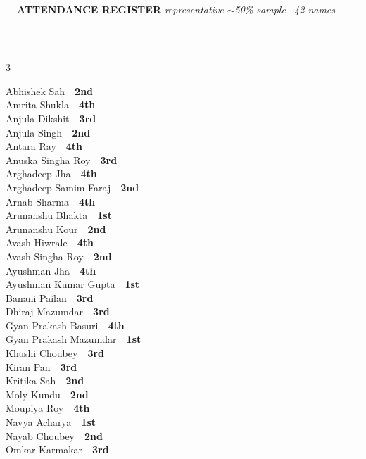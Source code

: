 \documentclass[11pt,a4paper]{article}
\begin{document}
\vspace{3pt}\noindent
{\footnotesize\bfseries\color{Slate}\faListOl~~ATTENDANCE REGISTER}%
\hfill{\scriptsize\itshape\color{Slate}representative $\sim$50\% sample \textperiodcentered\ 42 names}\\[3pt]
{\color{Line}\rule{\linewidth}{0.5pt}}\\[5pt]
\begingroup\footnotesize\setlength{\columnsep}{20pt}\setlength{\parskip}{1pt}%
\begin{multicols}{3}\raggedright
Abhishek Sah~\dotfill~\textbf{2nd}\\
Amrita Shukla~\dotfill~\textbf{4th}\\
Anjula Dikshit~\dotfill~\textbf{3rd}\\
Anjula Singh~\dotfill~\textbf{2nd}\\
Antara Ray~\dotfill~\textbf{4th}\\
Anuska Singha Roy~\dotfill~\textbf{3rd}\\
Arghadeep Jha~\dotfill~\textbf{4th}\\
Arghadeep Samim Faraj~\dotfill~\textbf{2nd}\\
Arnab Sharma~\dotfill~\textbf{4th}\\
Arunanshu Bhakta~\dotfill~\textbf{1st}\\
Arunanshu Kour~\dotfill~\textbf{2nd}\\
Avash Hiwrale~\dotfill~\textbf{4th}\\
Avash Singha Roy~\dotfill~\textbf{2nd}\\
Ayushman Jha~\dotfill~\textbf{4th}\\
Ayushman Kumar Gupta~\dotfill~\textbf{1st}\\
Banani Pailan~\dotfill~\textbf{3rd}\\
Dhiraj Mazumdar~\dotfill~\textbf{3rd}\\
Gyan Prakash Basuri~\dotfill~\textbf{4th}\\
Gyan Prakash Mazumdar~\dotfill~\textbf{1st}\\
Khushi Choubey~\dotfill~\textbf{3rd}\\
Kiran Pan~\dotfill~\textbf{3rd}\\
Kritika Sah~\dotfill~\textbf{2nd}\\
Moly Kundu~\dotfill~\textbf{2nd}\\
Moupiya Roy~\dotfill~\textbf{4th}\\
Navya Acharya~\dotfill~\textbf{1st}\\
Nayab Choubey~\dotfill~\textbf{2nd}\\
Omkar Karmakar~\dotfill~\textbf{3rd}\\

\end{multicols}
\end{document}
